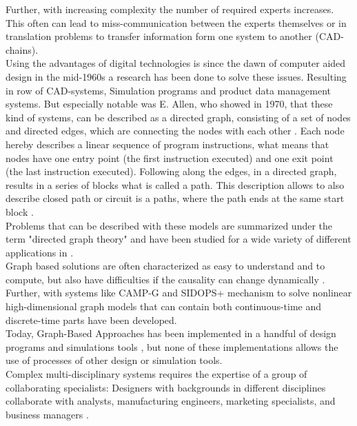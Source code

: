 Further, with increasing complexity the number of required experts increases.
This often can lead to miss-communication between the experts themselves or in translation problems 
to transfer information form one system to another (CAD-chains).\\
Using the advantages of digital technologies is since the dawn of computer aided design in the mid-1960s
a research has been done to solve these issues. 
Resulting in row of CAD-systems, Simulation programs and product data management systems.
But especially notable was E. Allen, who showed in 1970, that these kind of systems, 
can be described as a directed graph, consisting of a set of nodes and directed edges, 
which are connecting the nodes with each other \cite{allen_control_1970}.
Each node hereby describes a linear sequence of program instructions, 
what means that nodes have one entry point (the first instruction executed) and 
one exit point (the last instruction executed).
Following along the edges, in a directed graph, results in a series of blocks what is called a path.
This description allows to also describe closed path or circuit is a paths, 
where the path ends at the same start block \cite{allen_control_1970}.\\
Problems that can be described with these models are summarized 
under the term "directed graph theory" \cite{bang-jensen_digraphs_2009, lehman_directed_2010}
and have been studied for a wide variety of different applications in 
\cite{lehman_directed_2010, aho_theory_1972, kam_global_1976}.\\
Graph based solutions are often characterized as easy to understand and to compute, 
but also have difficulties if the causality can change dynamically \cite{sinha_modeling_2001}. 
Further, with systems like CAMP-G and SIDOPS+ \cite{breunese_modeling_1996} mechanism to solve 
nonlinear high-dimensional graph models that can contain both continuous-time and 
discrete-time parts have been developed.\\
Today, Graph-Based Approaches has been implemented in a handful of design programs and 
simulations tools \cite{noauthor_dynamo_2020, noauthor_function_2020, noauthor_systems_2020},
but none of these implementations allows the use of processes of other design or simulation tools.\\
Complex multi-disciplinary systems requires the expertise of a group of collaborating specialists:
Designers with backgrounds in different disciplines collaborate with analysts, manufacturing engineers, marketing
specialists, and business managers \cite{sinha_modeling_2001}.\\
